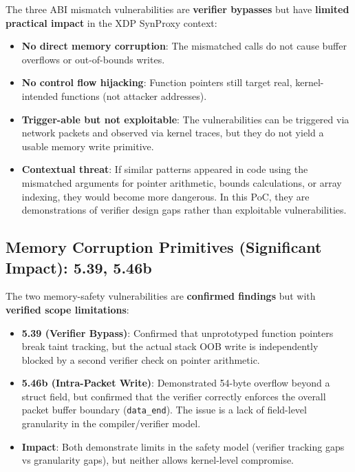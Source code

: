 The three ABI mismatch vulnerabilities are \textbf{verifier bypasses} but have \textbf{limited practical impact} in the XDP SynProxy context:

\begin{itemize}
  \item \textbf{No direct memory corruption}: The mismatched calls do not cause buffer overflows or out-of-bounds writes.
  \item \textbf{No control flow hijacking}: Function pointers still target real, kernel-intended functions (not attacker addresses).
  \item \textbf{Trigger-able but not exploitable}: The vulnerabilities can be triggered via network packets and observed via kernel traces, but they do not yield a usable memory write primitive.
  \item \textbf{Contextual threat}: If similar patterns appeared in code using the mismatched arguments for pointer arithmetic, bounds calculations, or array indexing, they would become more dangerous. In this PoC, they are demonstrations of verifier design gaps rather than exploitable vulnerabilities.
\end{itemize}

\subsection{Memory Corruption Primitives (Significant Impact): 5.39, 5.46b}

The two memory-safety vulnerabilities are \textbf{confirmed findings} but with \textbf{verified scope limitations}:

\begin{itemize}
  \item \textbf{5.39 (Verifier Bypass)}: Confirmed that unprototyped function pointers break taint tracking, but the actual stack OOB write is independently blocked by a second verifier check on pointer arithmetic.
  \item \textbf{5.46b (Intra-Packet Write)}: Demonstrated 54-byte overflow beyond a struct field, but confirmed that the verifier correctly enforces the overall packet buffer boundary (\texttt{data\_end}). The issue is a lack of field-level granularity in the compiler/verifier model.
  \item \textbf{Impact}: Both demonstrate limits in the safety model (verifier tracking gaps vs granularity gaps), but neither allows kernel-level compromise.
\end{itemize}

